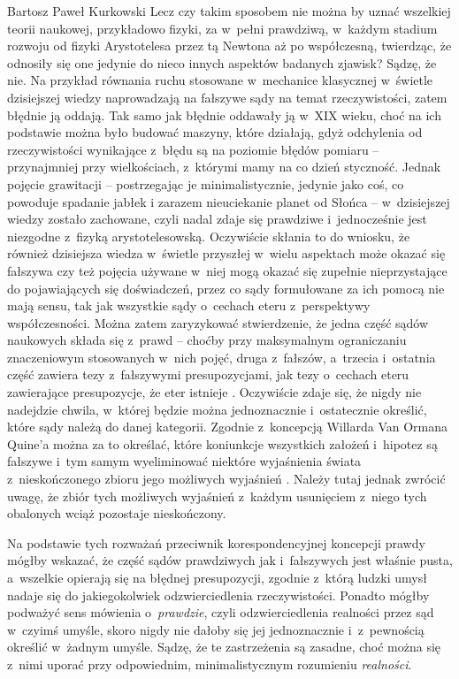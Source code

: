 \begin{artplenv}{Bartosz Paweł Kurkowski}
Lecz czy takim sposobem nie można by uznać wszelkiej teorii naukowej, przykładowo fizyki, za w~pełni prawdziwą, w~każdym
stadium rozwoju od fizyki Arystotelesa przez tą Newtona aż po współczesną, twierdząc, że odnosiły się one jedynie do
nieco innych aspektów badanych zjawisk? Sądzę, że nie. Na przykład równania ruchu stosowane w~mechanice
klasycznej w~świetle dzisiejszej wiedzy naprowadzają na fałszywe sądy na temat rzeczywistości, zatem błędnie ją oddają.
Tak samo jak
błędnie oddawały ją w~XIX wieku, choć na ich podstawie można było budować maszyny, które działają, gdyż odchylenia od
rzeczywistości wynikające z~błędu są na poziomie błędów pomiaru -- przynajmniej przy wielkościach, z~którymi mamy na co
dzień styczność. Jednak pojęcie grawitacji -- postrzegając je minimalistycznie, jedynie jako coś, co powoduje spadanie
jabłek\textit{ }i zarazem nieuciekanie planet od Słońca -- w~dzisiejszej wiedzy zostało zachowane, czyli nadal zdaje się
prawdziwe i~jednocześnie jest niezgodne z~fizyką arystotelesowską. Oczywiście skłania to do wniosku, że również
dzisiejsza wiedza w~świetle przyszłej w~wielu aspektach może okazać się fałszywa czy też pojęcia używane w~niej mogą
okazać się zupełnie nieprzystające do pojawiających się doświadczeń, przez co sądy formułowane za ich pomocą nie mają
sensu, tak jak wszystkie sądy o~cechach eteru z~perspektywy współczesności. Można zatem zaryzykować stwierdzenie, że
jedna część sądów naukowych składa się z~prawd -- choćby przy maksymalnym ograniczaniu znaczeniowym stosowanych w~nich
pojęć, druga z~fałszów, a~trzecia i~ostatnia część zawiera tezy z~fałszywymi presupozycjami, jak tezy o~cechach eteru
zawierające presupozycje, że eter istnieje
\parencite[s.~99]{grobler_metodologia_2006}.
Oczywiście zdaje się, że
nigdy nie nadejdzie chwila, w~której będzie można jednoznacznie i~ostatecznie określić, które sądy należą do danej
kategorii. Zgodnie z~koncepcją Willarda Van Ormana Quine’a można za to określać, które koniunkcje wszystkich założeń i~hipotez są fałszywe
i~tym samym wyeliminować niektóre wyjaśnienia świata z~nieskończonego zbioru jego możliwych wyjaśnień
\parencite[s.~77]{grobler_metodologia_2006}.
Należy tutaj jednak zwrócić uwagę, że zbiór tych możliwych
wyjaśnień z~każdym usunięciem z~niego tych obalonych wciąż pozostaje nieskończony.


Na podstawie tych rozważań przeciwnik korespondencyjnej koncepcji prawdy mógłby wskazać, że część sądów prawdziwych
jak i~fałszywych jest właśnie pusta, a~wszelkie opierają się na błędnej presupozycji, zgodnie z~którą ludzki umysł nadaje
się do jakiegokolwiek odzwierciedlenia rzeczywistości. Ponadto mógłby podważyć sens mówienia o~\textit{prawdzie}, czyli
odzwierciedlenia realności przez sąd w~czyimś umyśle, skoro nigdy nie dałoby się jej jednoznacznie i~z~pewnością
określić w~żadnym umyśle. Sądzę, że te zastrzeżenia są zasadne, choć można się z~nimi uporać przy odpowiednim,
minimalistycznym rozumieniu \textit{realności}.


\end{artplenv}
